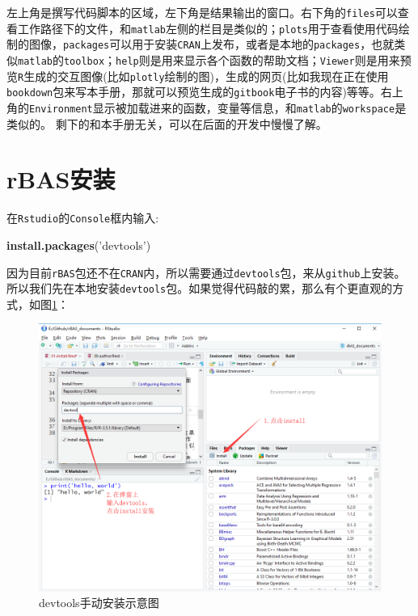 \documentclass[]{ctexbook}
\newenvironment{Shaded}{\begin{snugshade}}{\end{snugshade}}
\newcommand{\KeywordTok}[1]{\textcolor[rgb]{0.13,0.29,0.53}{\textbf{#1}}}
\newcommand{\StringTok}[1]{\textcolor[rgb]{0.31,0.60,0.02}{#1}}
\newcommand{\NormalTok}[1]{#1}
\theoremstyle{definition}
\theoremstyle{definition}
\theoremstyle{definition}
\theoremstyle{remark}
\begin{document}
左上角是撰写代码脚本的区域，左下角是结果输出的窗口。右下角的\texttt{files}可以查看工作路径下的文件，和\texttt{matlab}左侧的栏目是类似的；\texttt{plots}用于查看使用代码绘制的图像，\texttt{packages}可以用于安装\texttt{CRAN}上发布，或者是本地的\texttt{packages}，也就类似\texttt{matlab}的\texttt{toolbox}；\texttt{help}则是用来显示各个函数的帮助文档；\texttt{Viewer}则是用来预览\texttt{R}生成的交互图像(比如\texttt{plotly}绘制的图)，生成的网页(比如我现在正在使用\texttt{bookdown}包来写本手册，那就可以预览生成的\texttt{gitbook}电子书的内容)等等。右上角的\texttt{Environment}显示被加载进来的函数，变量等信息，和\texttt{matlab}的\texttt{workspace}是类似的。
剩下的和本手册无关，可以在后面的开发中慢慢了解。

\section{rBAS安装}\label{rBASinstall}

在\texttt{Rstudio}的\texttt{Console}框内输入:

\begin{Shaded}
\begin{Highlighting}[]
\KeywordTok{install.packages}\NormalTok{(}\StringTok{'devtools'}\NormalTok{)}
\end{Highlighting}
\end{Shaded}

因为目前\texttt{rBAS}包还不在\texttt{CRAN}内，所以需要通过\texttt{devtools}包，来从\texttt{github}上安装。所以我们先在本地安装\texttt{devtools}包。如果觉得代码敲的累，那么有个更直观的方式，如图\ref{fig:devtools}：

\begin{figure}

{\centering \includegraphics[width=0.8\linewidth]{img/rBAS} 

}

\caption{devtools手动安装示意图}\label{fig:devtools}
\end{figure}
\end{document}
